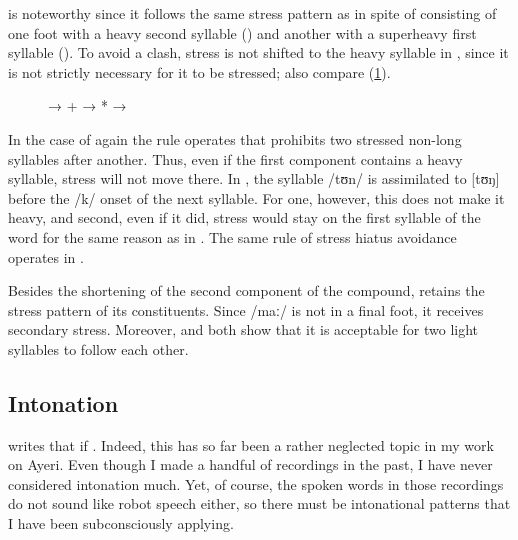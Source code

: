 is noteworthy since it follows the same stress
pattern as  in spite of consisting of one foot with
a heavy second syllable () and another with a superheavy
first syllable (). To avoid a clash, stress is not shifted
to the heavy syllable in , since it is not strictly
necessary for it to be stressed; also compare (\ref{ex:depangcati}).

\begin{figure}[h]
\pex\label{ex:depangcati}
\a * → 
\a {} +  → *
\a * → 
\xe
\end{figure}

In the case of  again the rule operates that
prohibits two stressed non-long syllables after another. Thus, even if the
first component  contains a heavy syllable, stress will not
move there. In , the syllable /tʊn/ is assimilated
 to [tʊŋ] before the /k/ onset of the next
syllable. For one, however, this does not make it heavy, and second, even if it
did, stress would stay on the first syllable of the word for the same reason as
in . The same rule of stress hiatus avoidance
operates in .

Besides the shortening of the second component of the compound, 
 retains the stress pattern of its constituents.
Since /maː/ is not in a final foot, it receives secondary stress. Moreover,
 and  both show that 
it is acceptable for two light syllables to follow each other.


\subsection{Intonation}

\citet{peterson2015} writes that if . Indeed, this has so far been a rather neglected topic in my work on
Ayeri. Even though I made a handful of recordings in the past, I have never
considered intonation much. Yet, of course, the spoken words in those
recordings do not sound like robot speech either, so there must be intonational
patterns that I have been subconsciously applying.

